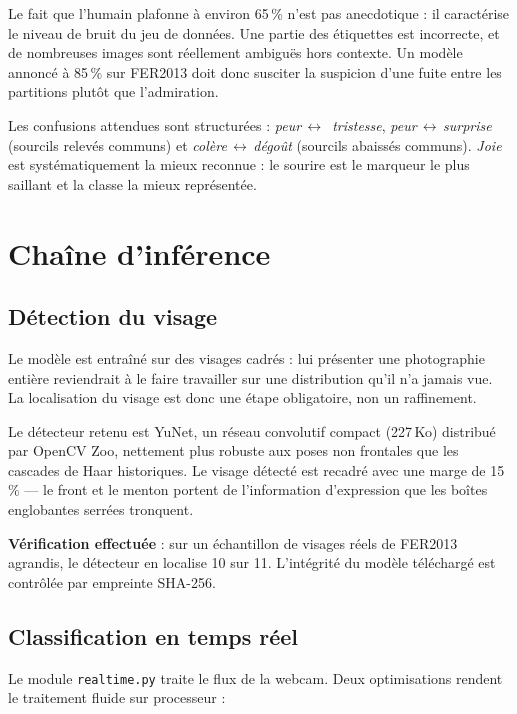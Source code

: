 \documentclass[11pt,a4paper]{article}
\newcommand{\code}[1]{\texttt{\small #1}}
\begin{document}
Le fait que l'humain plafonne à environ 65\,\% n'est pas anecdotique : il
caractérise le niveau de bruit du jeu de données. Une partie des étiquettes est
incorrecte, et de nombreuses images sont réellement ambiguës hors contexte. Un
modèle annoncé à 85\,\% sur FER2013 doit donc susciter la suspicion d'une fuite
entre les partitions plutôt que l'admiration.

Les confusions attendues sont structurées : \emph{peur}\,$\leftrightarrow$\,%
\emph{tristesse}, \emph{peur}\,$\leftrightarrow$\,\emph{surprise} (sourcils
relevés communs) et \emph{colère}\,$\leftrightarrow$\,\emph{dégoût} (sourcils
abaissés communs). \emph{Joie} est systématiquement la mieux reconnue : le
sourire est le marqueur le plus saillant et la classe la mieux représentée.

\section{Chaîne d'inférence}

\subsection{Détection du visage}

Le modèle est entraîné sur des visages cadrés : lui présenter une photographie
entière reviendrait à le faire travailler sur une distribution qu'il n'a jamais
vue. La localisation du visage est donc une étape obligatoire, non un
raffinement.

Le détecteur retenu est YuNet, un réseau convolutif compact (227\,Ko) distribué
par OpenCV Zoo, nettement plus robuste aux poses non frontales que les cascades
de Haar historiques. Le visage détecté est recadré avec une marge de 15\,\%
--- le front et le menton portent de l'information d'expression que les boîtes
englobantes serrées tronquent.

\textbf{Vérification effectuée} : sur un échantillon de visages réels de
FER2013 agrandis, le détecteur en localise 10 sur 11. L'intégrité du modèle
téléchargé est contrôlée par empreinte SHA-256.

\subsection{Classification en temps réel}

Le module \code{realtime.py} traite le flux de la webcam. Deux optimisations
rendent le traitement fluide sur processeur :
\end{document}
